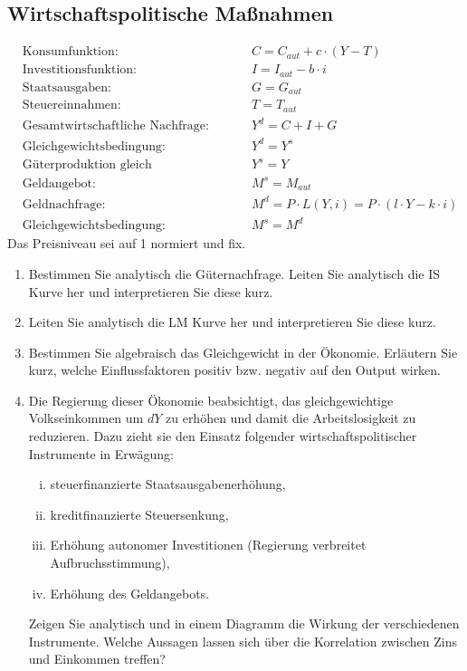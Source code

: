 \documentclass{scrartcl}
\begin{document}
\subsection{Wirtschaftspolitische Ma{\ss}nahmen}
\begin{align*}
&\text{Konsumfunktion: } &\quad& C = C_{aut} + c \cdot (Y-T)\\
&\text{Investitionsfunktion: } &\quad&I = I_{aut}-b\cdot i\\
&\text{Staatsausgaben: } &\quad& G=G_{aut}\\
&\text{Steuereinnahmen: } &\quad& T=T_{aut}\\
&\text{Gesamtwirtschaftliche Nachfrage: } &\quad&Y^d = C + I + G\\
&\text{Gleichgewichtsbedingung: } &\quad&Y^d = Y^s\\
&\text{Güterproduktion gleich Volkseinkommen: } &\quad& Y^s = Y\\
&\text{Geldangebot: }&\quad& M^s=M_{aut}\\
&\text{Geldnachfrage: } &\quad& M^d=P\cdot L(Y,i) = P\cdot (l\cdot Y - k \cdot i)\\
&\text{Gleichgewichtsbedingung: } &\quad& M^s=M^d
\end{align*}
Das Preisniveau sei auf 1 normiert und fix.
\begin{enumerate}
	\item Bestimmen Sie analytisch die Güternachfrage. Leiten Sie analytisch die IS Kurve her und interpretieren Sie diese kurz.
	\item Leiten Sie analytisch die LM Kurve her und interpretieren Sie diese kurz.
	\item Bestimmen Sie algebraisch das Gleichgewicht in der Ökonomie. Erläutern Sie kurz, welche Einflussfaktoren positiv bzw. negativ auf den Output wirken.
	\item Die Regierung dieser \"{O}konomie beabsichtigt, das gleichgewichtige Volkseinkommen um $dY$ zu erh\"{o}hen und damit die Arbeitslosigkeit zu reduzieren. Dazu zieht sie den Einsatz
folgender wirtschaftspolitischer Instrumente in Erw\"{a}gung:
\begin{enumerate}[(i)]
  \item steuerfinanzierte Staatsausgabenerh\"{o}hung,
  \item kreditfinanzierte Steuersenkung,
  \item Erh\"{o}hung autonomer Investitionen (Regierung verbreitet
      Aufbruchsstimmung),
  \item Erh\"{o}hung des Geldangebots.
\end{enumerate}
Zeigen Sie analytisch und in einem Diagramm die Wirkung der verschiedenen Instrumente. Welche Aussagen lassen sich \"{u}ber die Korrelation zwischen Zins und Einkommen treffen?
\end{enumerate}
\end{document}
